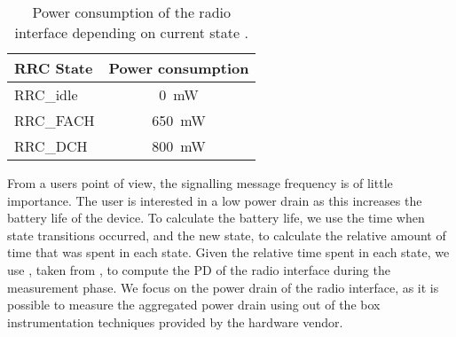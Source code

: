 \begin{table}
  \centering
  \caption{Power consumption of the  radio interface depending on current  state \cite{Qian2011a}.}
  \label{tab:network:network_traces:calculating_metrics:power_consumption}
  \begin{tabular}{lc}
  	\toprule
    \gls{RRC} State & Power consumption\\
    \midrule
    \gls{RRC_idle} & \SI{0}{\milli\watt}\\
    \gls{RRC_FACH} & \SI{650}{\milli\watt}\\
    \gls{RRC_DCH} & \SI{800}{\milli\watt}\\
    \bottomrule
  \end{tabular}
\end{table}

From a users point of view, the signalling message frequency is of little importance.
The user is interested in a low power drain as this increases the battery life of the device.
To calculate the battery life, we use the time when state transitions occurred, and the new state, to calculate the relative amount of time that was spent in each state.
Given the relative time spent in each state, we use , taken from \cite{Qian2011a}, to compute the \gls{PD} of the radio interface during the measurement phase.
We focus on the power drain of the radio interface, as it is possible to measure the aggregated power drain using out of the box instrumentation techniques provided by the hardware vendor.
